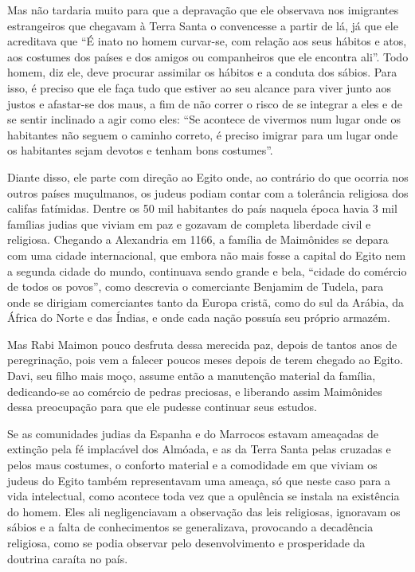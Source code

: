 Mas não tardaria muito para que a depravação que ele observava nos
imigrantes estrangeiros que chegavam à Terra Santa o convencesse a
partir de lá, já que ele acreditava que ``É inato no homem curvar-se,
com relação aos seus hábitos e atos, aos costumes dos países e dos
amigos ou companheiros que ele encontra ali''. Todo homem, diz ele, deve
procurar assimilar os hábitos e a conduta dos sábios. Para isso, é
preciso que ele faça tudo que estiver ao seu alcance para viver junto
aos justos e afastar-se dos maus, a fim de não correr o risco de se
integrar a eles e de se sentir inclinado a agir como eles: ``Se acontece
de vivermos num lugar onde os habitantes não seguem o caminho correto, é
preciso imigrar para um lugar onde os habitantes sejam devotos e tenham
bons costumes''.

Diante disso, ele parte com direção ao Egito onde, ao contrário do que
ocorria nos outros países muçulmanos, os judeus podiam contar com a
tolerância religiosa dos califas fatímidas. Dentre os 50 mil habitantes
do país naquela época havia 3 mil famílias judias que viviam em paz e
gozavam de completa liberdade civil e religiosa. Chegando a Alexandria
em 1166, a família de Maimônides se depara com uma cidade internacional,
que embora não mais fosse a capital do Egito nem a segunda cidade do
mundo, continuava sendo grande e bela, ``cidade do comércio de todos os
povos'', como descrevia o comerciante Benjamim de Tudela, para onde se
dirigiam comerciantes tanto da Europa cristã, como do sul da Arábia, da
África do Norte e das Índias, e onde cada nação possuía seu próprio
armazém.

Mas Rabi Maimon pouco desfruta dessa merecida paz, depois de tantos
anos de peregrinação, pois vem a falecer poucos meses depois de terem
chegado ao Egito. Davi, seu filho mais moço, assume então a manutenção
material da família, dedicando-se ao comércio de pedras preciosas, e
liberando assim Maimônides dessa preocupação para que ele pudesse
continuar seus estudos.

Se as comunidades judias da Espanha e do Marrocos estavam ameaçadas de
extinção pela fé implacável dos Almóada, e as da Terra Santa pelas
cruzadas e pelos maus costumes, o conforto material e a comodidade em
que viviam os judeus do Egito também representavam uma ameaça, só que
neste caso para a vida intelectual, como acontece toda vez que a
opulência se instala na existência do homem. Eles ali negligenciavam a
observação das leis religiosas, ignoravam os sábios e a falta de
conhecimentos se generalizava, provocando a decadência religiosa, como
se podia observar pelo desenvolvimento e prosperidade da doutrina
caraíta no país.

